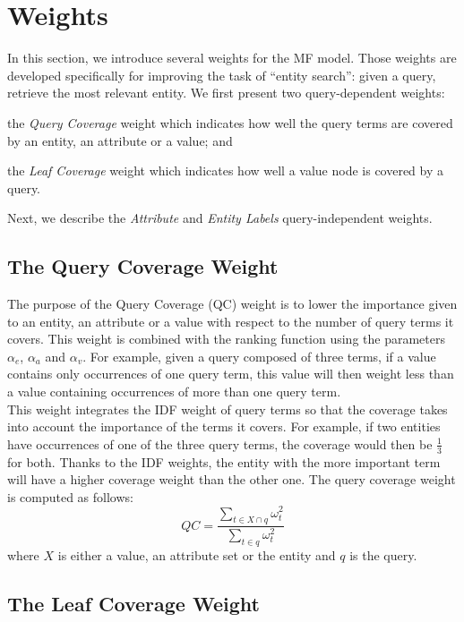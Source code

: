 \section{Weights}
\label{sec:weights}

In this section, we introduce several weights for the \gls{MF} model. Those weights are developed specifically for improving the task of ``entity search'': given a query, retrieve the most relevant entity. We first present two query-dependent weights:
\begin{inparaenum}[(1)]
  \item the \emph{Query Coverage} weight which indicates how well the query terms are covered by an entity, an attribute or a value; and
  \item the \emph{Leaf Coverage} weight which indicates how well a value node is covered by a query.
\end{inparaenum}
Next, we describe the \emph{Attribute} and \emph{Entity Labels} query-independent weights.

\subsection{The Query Coverage Weight}
\label{sec:kw-factor}

The purpose of the Query Coverage (QC) weight is to lower the importance given to an entity, an attribute or a value with respect to the number of query terms it covers. This weight is combined with the ranking function using the parameters $\alpha_e$, $\alpha_a$ and $\alpha_v$. For example, given a query composed of three terms, if a value contains only occurrences of one query term, this value will then weight less than a value containing occurrences of more than one query term.\\

This weight integrates the IDF weight of query terms so that the coverage takes into account the importance of the terms it covers. For example, if two entities have occurrences of one of the three query terms, the coverage would then be $\frac{1}{3}$ for both. Thanks to the IDF weights, the entity with the more important term will have a higher coverage weight than the other one.
The query coverage weight is computed as follows:
$$
QC = \frac{\sum_{t\in X \cap q}{\omega_t^2}}{\sum_{t\in q}{\omega_t^2}}
$$
where $X$ is either a value, an attribute set or the entity and $q$ is the query.

\subsection{The Leaf Coverage Weight}
\label{sec:leaf-coverage}

